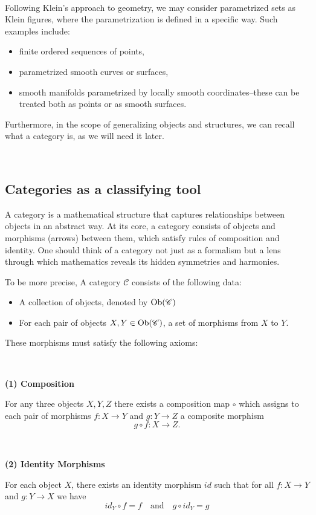 \,

Following Klein's approach to geometry, we may consider parametrized sets as Klein figures, where the parametrization is defined in a specific way. Such examples include:
    \begin{itemize}
        \item finite ordered sequences of points,  
        \item parametrized smooth curves or surfaces,  
        \item smooth manifolds parametrized by locally smooth coordinates--these can be treated both as points or as smooth surfaces.
        \end{itemize}

Furthermore, in the scope of generalizing objects and structures, we can recall what a category is, as we will need it later. 

\,
\subsection{Categories as a classifying tool}
A category is a mathematical structure that captures relationships between objects in an abstract way. At its core, a category consists of objects and morphisms (arrows) between them, which satisfy rules of composition and identity. One should think of a category not just as a formalism but a lens through which mathematics reveals its hidden symmetries and harmonies.

To be more precise, A category 
$\mathscr{C}$ consists of the following data:
\begin{itemize}
    \item A collection of objects, denoted by ${\rm Ob}(\mathscr{C})$
       \item  For each pair of objects $X, Y \in {\rm Ob}(\mathscr{C})$, a set of morphisms from $X$ to $Y$.
\end{itemize}
These morphisms must satisfy the following axioms:

\,

{\bf (1) Composition} 

For any three objects $X,Y,Z$ there exists a composition map $\circ$ which assigns to each pair of morphisms $f:X\to Y$ and $g:Y\to Z$ a composite morphism 
\[g\circ f:X\to Z.\]

\,

{\bf (2) Identity Morphisms}

For each object $X$, there exists an identity morphism $id$ such that for all 
$f:X\to Y$ and $g:Y\to X$ we have 
\[id_Y\circ f=f\quad \text{and} \quad g\circ id_Y=g\]


